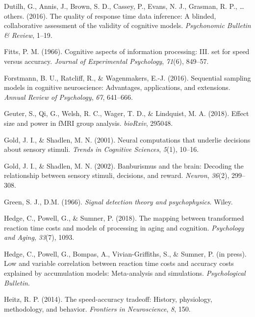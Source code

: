 \documentclass[floatsintext,doc]{apa6}
\theoremstyle{definition}
\theoremstyle{definition}
\theoremstyle{definition}
\theoremstyle{remark}
\begin{document}
\hypertarget{ref-dutilh2016quality}{}
Dutilh, G., Annis, J., Brown, S. D., Cassey, P., Evans, N. J., Grasman,
R. P., \ldots{} others. (2016). The quality of response time data
inference: A blinded, collaborative assessment of the validity of
cognitive models. \emph{Psychonomic Bulletin \& Review}, 1--19.

\hypertarget{ref-fitts1966cognitive}{}
Fitts, P. M. (1966). Cognitive aspects of information processing: III.
set for speed versus accuracy. \emph{Journal of Experimental
Psychology}, \emph{71}(6), 849--57.

\hypertarget{ref-forstmann2016sequential}{}
Forstmann, B. U., Ratcliff, R., \& Wagenmakers, E.-J. (2016). Sequential
sampling models in cognitive neuroscience: Advantages, applications, and
extensions. \emph{Annual Review of Psychology}, \emph{67}, 641--666.

\hypertarget{ref-geuter2018effect}{}
Geuter, S., Qi, G., Welsh, R. C., Wager, T. D., \& Lindquist, M. A.
(2018). Effect size and power in fMRI group analysis. \emph{bioRxiv},
295048.

\hypertarget{ref-gold2001neural}{}
Gold, J. I., \& Shadlen, M. N. (2001). Neural computations that underlie
decisions about sensory stimuli. \emph{Trends in Cognitive Sciences},
\emph{5}(1), 10--16.

\hypertarget{ref-gold2002banburismus}{}
Gold, J. I., \& Shadlen, M. N. (2002). Banburismus and the brain:
Decoding the relationship between sensory stimuli, decisions, and
reward. \emph{Neuron}, \emph{36}(2), 299--308.

\hypertarget{ref-green1966signal}{}
Green, S. J., D.M. (1966). \emph{Signal detection theory and
psychophysics}. Wiley.

\hypertarget{ref-hedge2018mapping}{}
Hedge, C., Powell, G., \& Sumner, P. (2018). The mapping between
transformed reaction time costs and models of processing in aging and
cognition. \emph{Psychology and Aging}, \emph{33}(7), 1093.

\hypertarget{ref-hedgelow}{}
Hedge, C., Powell, G., Bompas, A., Vivian-Griffiths, S., \& Sumner, P.
(in press). Low and variable correlation between reaction time costs and
accuracy costs explained by accumulation models: Meta-analysis and
simulations. \emph{Psychological Bulletin}.

\hypertarget{ref-heitz2014speed}{}
Heitz, R. P. (2014). The speed-accuracy tradeoff: History, physiology,
methodology, and behavior. \emph{Frontiers in Neuroscience}, \emph{8},
150.
\end{document}
